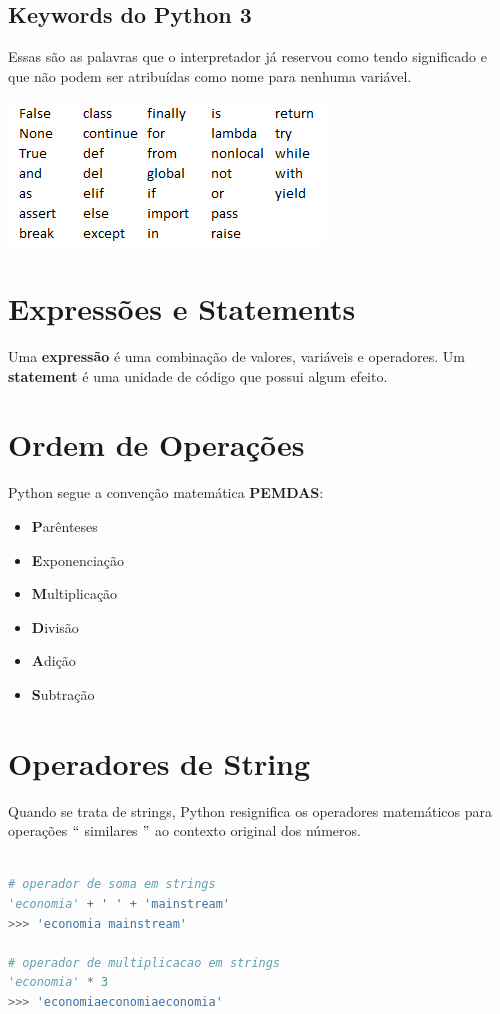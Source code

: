 \documentclass[a4paper,11pt]{book}
\begin{document}
\subsection{Keywords do Python 3}
Essas são as palavras que o interpretador já reservou como tendo significado e que não podem ser atribuídas como nome para nenhuma variável.

\includegraphics[scale=1]{images/keywords_python.png}

\section{Expressões e Statements}
Uma \textbf{expressão} é uma combinação de valores, variáveis e operadores. Um \textbf{statement} é uma unidade de código que possui algum efeito.

\section{Ordem de Operações}
Python segue a convenção matemática \textbf{PEMDAS}:
\begin{itemize}
	\item \textbf{P}arênteses
	\item \textbf{E}xponenciação
	\item \textbf{M}ultiplicação
	\item \textbf{D}ivisão
	\item \textbf{A}dição
	\item \textbf{S}ubtração
\end{itemize}

\section{Operadores de String}
Quando se trata de strings, Python resignifica os operadores matemáticos para operações $``$ similares $"$ ao contexto original dos números.
\begin{lstlisting}[language=Python, caption=Operadores com strings]

# operador de soma em strings
'economia' + ' ' + 'mainstream'
>>> 'economia mainstream'

# operador de multiplicacao em strings
'economia' * 3
>>> 'economiaeconomiaeconomia'

\end{lstlisting}
\end{document}
